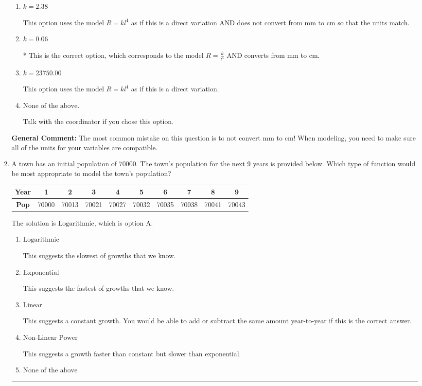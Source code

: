 \documentclass{extbook}[14pt]
\newcommand{\litem}[1]{\item #1

\rule{\textwidth}{0.4pt}}
\begin{document}
\begin{enumerate}
{\begin{enumerate}[label=\Alph*.]
This option uses the correct model, $R = \frac{k}{l^{4}}$, but does not convert from mm to cm so that the units match.
\item \( k = 2.38 \)

This option uses the model $R = kl^{4}$ as if this is a direct variation AND does not convert from mm to cm so that the units match.
\item \( k = 0.06 \)

* This is the correct option, which corresponds to the model $R = \frac{k}{l^{4}}$ AND converts from mm to cm.
\item \( k = 23750.00 \)

This option uses the model $R = kl^{4}$ as if this is a direct variation.
\item \( \text{None of the above.} \)

Talk with the coordinator if you chose this option.
\end{enumerate}

\textbf{General Comment:} The most common mistake on this question is to not convert mm to cm! When modeling, you need to make sure all of the units for your variables are compatible.
}
\litem{
A town has an initial population of 70000. The town's population for the next 9 years is provided below. Which type of function would be most appropriate to model the town's population?


\begin{tabular}{c|c|c|c|c|c|c|c|c|c}
\textbf{Year} &1 &2 &3 &4 &5 &6 &7 &8 &9\tabularnewline \hline
\textbf{Pop} &70000 &70013 &70021 &70027 &70032 &70035 &70038 &70041 &70043\end{tabular}The solution is \( \text{Logarithmic} \), which is option A.\begin{enumerate}[label=\Alph*.]
\item \( \text{Logarithmic} \)

This suggests the slowest of growths that we know.
\item \( \text{Exponential} \)

This suggests the fastest of growths that we know.
\item \( \text{Linear} \)

This suggests a constant growth. You would be able to add or subtract the same amount year-to-year if this is the correct answer.
\item \( \text{Non-Linear Power} \)

This suggests a growth faster than constant but slower than exponential.
\item \( \text{None of the above} \)


\end{enumerate}}
\end{enumerate}
\end{document}
